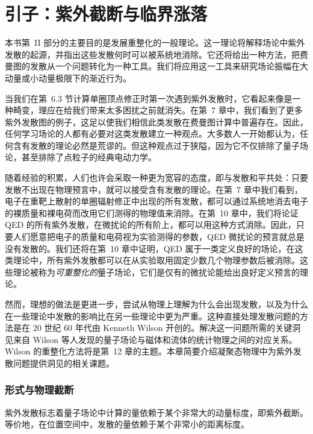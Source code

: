 \chapter{引子：紫外截断与临界涨落}

本书第~II 部分的主要目的是发展重整化的一般理论。这一理论将解释场论中紫外发散的起源，并指出这些发散何时可以被系统地消除。它还将给出一种方法，把费曼图的发散从一个问题转化为一种工具。我们将应用这一工具来研究场论振幅在大动量或小动量极限下的渐近行为。

当我们在第~6.3 节计算单圈顶点修正时第一次遇到紫外发散时，它看起来像是一种畸变，理应在给我们带来太多困扰之前就消失。在第~7 章中，我们看到了更多紫外发散图的例子，这足以使我们相信此类发散在费曼图计算中普遍存在。因此，任何学习场论的人都有必要对这类发散建立一种观点。大多数人一开始都认为，任何含有发散的理论必然是荒谬的。但这种观点过于狭隘，因为它不仅排除了量子场论，甚至排除了点粒子的经典电动力学。

随着经验的积累，人们也许会采取一种更为宽容的态度，即与发散和平共处：只要发散不出现在物理预言中，就可以接受含有发散的理论。在第~7 章中我们看到，电子在重靶上散射的单圈辐射修正中出现的所有发散，都可以通过系统地消去电子的裸质量和裸电荷而改用它们测得的物理值来消除。在第~10 章中，我们将论证 QED 的所有紫外发散，在微扰论的所有阶上，都可以用这种方式消除。因此，只要人们愿意把电子的质量和电荷视为实验测得的参数，QED 微扰论的预言就总是没有发散的。我们还将在第~10 章中证明，QED 属于一类定义良好的场论，在这类理论中，所有紫外发散都可以在从实验取用固定少数几个物理参数后被消除。这些理论被称为\emph{可重整化的}量子场论，它们是仅有的微扰论能给出良好定义预言的理论。

然而，理想的做法是更进一步，尝试从物理上理解为什么会出现发散，以及为什么在一些理论中发散的影响比在另一些理论中更为严重。这种直接处理发散问题的方法是在 20 世纪 60 年代由 Kenneth Wilson 开创的。解决这一问题所需的关键洞见来自 Wilson 等人发现的量子场论与磁体和流体的统计物理之间的对应关系。Wilson 的重整化方法将是第~12 章的主题。本章简要介绍凝聚态物理中为紫外发散问题提供洞见的相关课题。

\subsection*{形式与物理截断}

紫外发散标志着量子场论中计算的量依赖于某个非常大的动量标度，即紫外截断。等价地，在位置空间中，发散的量依赖于某个非常小的距离标度。


